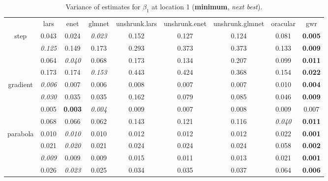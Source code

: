 \documentclass[authoryear, review, 11pt]{elsarticle}
\begin{document}
\begin{table}[ht]
\begin{center}
\begin{tabular}{ccccccccc}
  & lars & enet & glmnet & unshrunk.lars & unshrunk.enet & unshrunk.glmnet & oracular & gwr \\ 
  \cline{2-9}
  \multirow{4}{*}{step} & 0.043 & 0.024 & \emph{0.023} & 0.152 & 0.127 & 0.124 & 0.081 & \textbf{0.005} \\ 
  & \emph{0.125} & 0.149 & 0.173 & 0.293 & 0.373 & 0.373 & 0.133 & \textbf{0.009} \\ 
  & 0.064 & \emph{0.040} & 0.068 & 0.173 & 0.134 & 0.207 & 0.099 & \textbf{0.011} \\ 
  & 0.173 & 0.174 & \emph{0.153} & 0.443 & 0.424 & 0.368 & 0.154 & \textbf{0.022} \\ 
  \cline{2-9}
  \multirow{4}{*}{gradient} & \emph{0.006} & 0.007 & 0.006 & 0.008 & 0.007 & 0.007 & 0.010 & \textbf{0.004} \\ 
  & \emph{0.030} & 0.035 & 0.035 & 0.162 & 0.079 & 0.085 & 0.046 & \textbf{0.009} \\ 
  & 0.005 & \textbf{0.003} & \emph{0.004} & 0.009 & 0.007 & 0.008 & 0.009 & 0.007 \\ 
  & 0.068 & 0.066 & 0.062 & 0.143 & 0.121 & 0.116 & \emph{0.040} & \textbf{0.011} \\ 
  \cline{2-9}
  \multirow{4}{*}{parabola} & 0.010 & \emph{0.010} & 0.010 & 0.012 & 0.012 & 0.012 & 0.022 & \textbf{0.001} \\ 
  & 0.021 & \emph{0.020} & 0.021 & 0.024 & 0.024 & 0.024 & 0.058 & \textbf{0.002} \\ 
  & \emph{0.009} & 0.009 & 0.009 & 0.015 & 0.011 & 0.013 & 0.021 & \textbf{0.001} \\ 
  & 0.026 & \emph{0.023} & 0.025 & 0.034 & 0.035 & 0.037 & 0.064 & \textbf{0.006} \\ 
  \end{tabular}
\caption{Variance of estimates for $\beta_1$ at location 1 (\textbf{minimum}, \emph{next best}).\label{table:loc1-X1-varx}}
\end{center}
\end{table}
\end{document}
